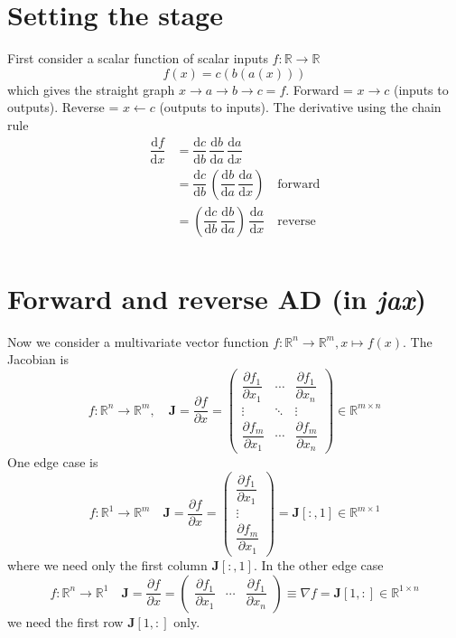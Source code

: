 \documentclass[paper=a4,11pt,headsepline]{scrartcl}
\newcommand{\ve}[1]{\ensuremath{\bm{\mathit{#1}}}}
\newcommand{\ma}[1]{\ensuremath{\bm{\mathbf{#1}}}}
\newcommand{\dd}{\text{d}}
\newcommand{\ra}{\ensuremath{\rightarrow}}
\newcommand{\la}{\ensuremath{\leftarrow}}
\newcommand{\pd}[2]{\dfrac{\partial #1}{\partial #2}}
\newcommand{\td}[2]{\dfrac{\dd #1}{\dd #2}}
\newcommand{\soft}[1]{\textsl{#1}\xspace}
\newcommand{\jax}{\soft{jax}}
\begin{document}
\section{Setting the stage}
%
First consider a scalar function of scalar inputs $f:\mathbb R\ra\mathbb R$
\begin{equation*}
    f(x) = c(b(a(x)))
\end{equation*}
which gives the straight graph $x\ra a\ra b\ra c = f$. Forward = $x \ra c$ (inputs
to outputs). Reverse = $x \la c$ (outputs to inputs).
The derivative using the chain rule
\begin{align*}
    \td{f}{x}
        &= \td{c}{b}\,\td{b}{a}\,\td{a}{x}\\
        &= \td{c}{b}\,\left(\td{b}{a}\,\td{a}{x}\right)\quad\text{forward}\\
        &= \left(\td{c}{b}\,\td{b}{a}\right)\,\td{a}{x}\quad\text{reverse}\\
\end{align*}

\section{Forward and reverse AD (in \jax)}

Now we consider a multivariate vector function $\ve f: \mathbb R^n \ra \mathbb
R^m, \ve x\mapsto \ve f(\ve x)$. The Jacobian is
\begin{equation*}
    \ve f: \mathbb R^n \ra \mathbb R^m,\quad \ma J
    = \pd{\ve f}{\ve x} =
    \begin{pmatrix}
        \pd{f_1}{x_1} & \cdots & \pd{f_1}{x_n}  \\
        \vdots        & \ddots & \vdots         \\
        \pd{f_m}{x_1} & \cdots & \pd{f_m}{x_n}
    \end{pmatrix}
    \in\mathbb R^{m\times n}
\end{equation*}
One edge case is
\begin{equation*}
    \ve f: \mathbb R^1 \ra \mathbb R^m\quad \ma J
    = \pd{\ve f}{x} =
    \begin{pmatrix}
        \pd{f_1}{x_1}  \\
        \vdots         \\
        \pd{f_m}{x_1}
    \end{pmatrix}
    = \ma J[:,1]\in\mathbb R^{m\times 1}
\end{equation*}
where we need only the first column $\ma J[:,1]$. In the other edge case
\begin{equation*}
    f: \mathbb R^n \ra \mathbb R^1\quad \ma J
    = \pd{f}{\ve x} =
    \begin{pmatrix}
        \pd{f_1}{x_1} & \cdots & \pd{f_1}{x_n}
    \end{pmatrix} \equiv \nabla f
    = \ma J[1,:] \in\mathbb R^{1\times n}
\end{equation*}
we need the first row $\ma J[1,:]$ only.
\end{document}
